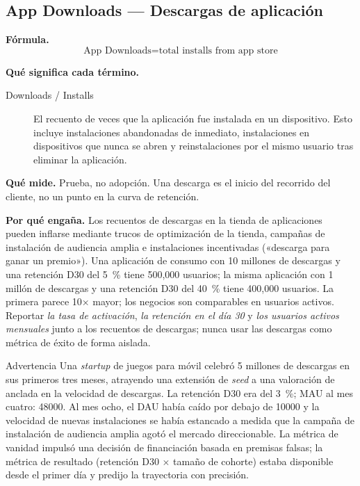 \subsection{App Downloads --- Descargas de aplicación}

\textbf{Fórmula.}
\[
  \text{App Downloads} = \text{total installs from app store}
\]

\textbf{Qué significa cada término.}
\begin{description}
  \item[Downloads / Installs] El recuento de veces que la aplicación fue instalada en un
    dispositivo. Esto incluye instalaciones abandonadas de inmediato, instalaciones en
    dispositivos que nunca se abren y reinstalaciones por el mismo usuario tras eliminar la
    aplicación.
\end{description}

\textbf{Qué mide.} Prueba, no adopción. Una descarga es el inicio del recorrido del cliente,
no un punto en la curva de retención.

\textbf{Por qué engaña.} Los recuentos de descargas en la tienda de aplicaciones pueden
inflarse mediante trucos de optimización de la tienda, campañas de instalación de audiencia
amplia e instalaciones incentivadas («descarga para ganar un premio»). Una aplicación de
consumo con 10 millones de descargas y una retención D30 del \qty{5}{\percent} tiene 500,000
usuarios; la misma aplicación con 1 millón de descargas y una retención D30 del
\qty{40}{\percent} tiene 400,000 usuarios. La primera parece 10$\times$ mayor; los negocios
son comparables en usuarios activos. Reportar \emph{la tasa de activación}, \emph{la
retención en el día 30} y \emph{los usuarios activos mensuales} junto a los recuentos de
descargas; nunca usar las descargas como métrica de éxito de forma aislada.

\begin{admonition}{Advertencia}
Una \emph{startup} de juegos para móvil celebró 5 millones de descargas en sus primeros tres
meses, atrayendo una extensión de \emph{seed} a una valoración de  anclada
en la velocidad de descargas. La retención D30 era del \qty{3}{\percent}; MAU al mes cuatro:
\num{48000}. Al mes ocho, el DAU había caído por debajo de \num{10000} y la velocidad de
nuevas instalaciones se había estancado a medida que la campaña de instalación de audiencia
amplia agotó el mercado direccionable. La métrica de vanidad impulsó una decisión de
financiación basada en premisas falsas; la métrica de resultado (retención D30 $\times$ tamaño
de cohorte) estaba disponible desde el primer día y predijo la trayectoria con precisión.
\end{admonition}
